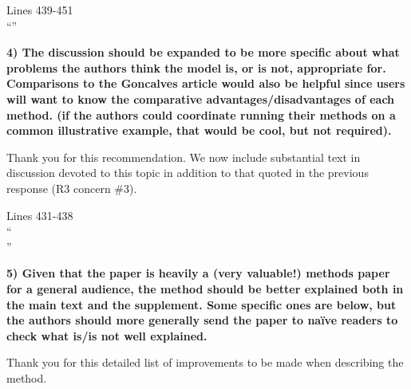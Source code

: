 \documentclass[11pt,a4paper]{article}
\begin{document}
\begin{displayquote}
Lines 439-451\\
``''

\end{displayquote}

\textbf{4) The discussion should be expanded to be more specific about what problems the authors think the model is, or is not, appropriate for. Comparisons to the Goncalves article would also be helpful since users will want to know the comparative advantages/disadvantages of each method. (if the authors could coordinate running their methods on a common illustrative example, that would be cool, but not required). }

Thank you for this recommendation.
We now include substantial text in discussion devoted to this topic in addition to that quoted in the previous response (R3 concern \#3).

\begin{displayquote}
Lines 431-438\\
`` \\ ''
\end{displayquote}

\textbf{5) Given that the paper is heavily a (very valuable!) methods paper for a general audience, the method should be better explained both in the main text and the supplement. Some specific ones are below, but the authors should more generally send the paper to naïve readers to check what is/is not well explained. }

Thank you for this detailed list of improvements to be made when describing the method.
\end{document}
